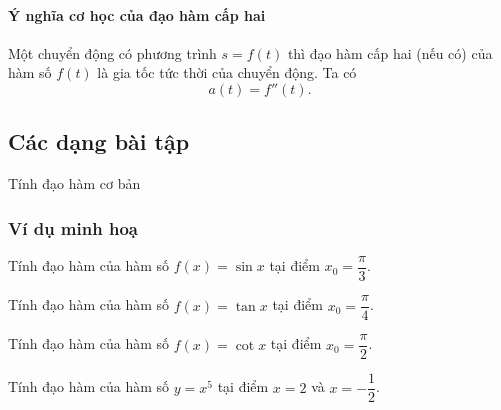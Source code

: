 \paragraph{Ý nghĩa cơ học của đạo hàm cấp hai}
\begin{dn}
	Một chuyển động có phương trình $s=f(t)$ thì đạo hàm cấp hai (nếu có) của hàm số $f(t)$ là gia tốc tức thời của chuyển động. Ta có $$a(t)=f''(t).$$
\end{dn}
\subsection{Các dạng bài tập}
\begin{dang}{Tính đạo hàm cơ bản}
\end{dang}
\subsubsection{Ví dụ minh hoạ}
\begin{vd}%
	Tính đạo hàm của hàm số $f(x)=\sin x$ tại điểm $x_0=\dfrac{\pi}{3}$.
\end{vd}
\begin{vd}%
	Tính đạo hàm của hàm số $f(x)=\tan x$ tại điểm $x_0=\dfrac{\pi}{4}$.	
\end{vd}
\begin{vd}%
	Tính đạo hàm của hàm số $f(x)=\cot x$ tại điểm $x_0=\dfrac{\pi}{2}$.	
\end{vd}
\begin{vd}%
	Tính đạo hàm của hàm số $y=x^5$ tại điểm $x=2$ và $x=-\dfrac{1}{2}$.
\end{vd}

